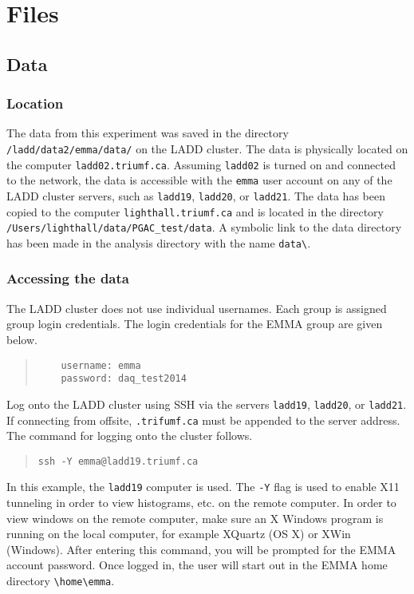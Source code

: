 \section{Files}
\subsection{Data}
\sloppy
\subsubsection{Location}
The data from this experiment was saved in the directory 
\verb|/ladd/data2/emma/data/| on the LADD cluster.  The data is physically located on the computer \texttt{ladd02.triumf.ca}. Assuming \texttt{ladd02} is turned on and connected to the network, the data is accessible with the \texttt{emma} user account on any of the LADD cluster servers, such as \texttt{ladd19}, \texttt{ladd20}, or \texttt{ladd21}. The data has been copied to the computer \texttt{lighthall.triumf.ca} and is located in the directory \verb|/Users/lighthall/data/PGAC_test/data|.
A symbolic link to the data directory has been made in the analysis directory with the name \verb|data\|.
\subsubsection{Accessing the data}
The LADD cluster does not use individual usernames. Each group is assigned group login credentials. The login credentials for the EMMA group are given below.
\begin{quote}
  \begin{verbatim}
    username: emma
    password: daq_test2014
  \end{verbatim}
\end{quote}
\vsetlinux
Log onto the LADD cluster using SSH via the servers \texttt{ladd19}, \texttt{ladd20}, or \texttt{ladd21}.  If connecting from offsite,  \texttt{.trifumf.ca} must be appended to the server address. The command for logging onto the cluster follows.
\begin{quote}
  \begin{Verbatim}
ssh -Y emma@ladd19.triumf.ca 
		\end{Verbatim}
\end{quote}
In this example, the \texttt{ladd19} computer is used. The \texttt{-Y} flag is used to enable X11 tunneling in order to view histograms, etc. on the remote computer. In order to view windows on the remote computer, make sure an X Windows program is running on the local computer, for example XQuartz (OS X) or XWin (Windows). After entering this command, you will be prompted for the EMMA account password. Once logged in, the user will start out in the EMMA home directory \verb|\home\emma|.
